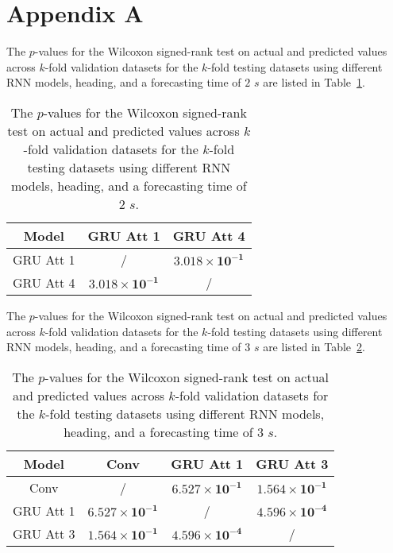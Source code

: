 \appendix
\section{Appendix A}
\label{appA}

The $p$-values for the Wilcoxon signed-rank test on actual and predicted values across $k$-fold validation datasets for the $k$-fold testing datasets using different RNN models, heading, and a forecasting time of $2$ $s$ are listed in Table~\ref{tab:direction:p:2}.

\begin{table}[!ht]
	\centering
	\begin{tabular}{|c|c|c|}
		\hline
		Model & GRU Att 1 & GRU Att 4 \\ \hline
		GRU Att 1 & / & $\mathbf{3.018 \times 10^{-1}}$ \\ \hline
		GRU Att 4 & $\mathbf{3.018 \times 10^{-1}}$ & / \\ \hline
	\end{tabular}
	\caption{The $p$-values for the Wilcoxon signed-rank test on actual and predicted values across $k$-fold validation datasets for the $k$-fold testing datasets using different RNN models, heading, and a forecasting time of $2$ $s$.}
	\label{tab:direction:p:2}
\end{table}

The $p$-values for the Wilcoxon signed-rank test on actual and predicted values across $k$-fold validation datasets for the $k$-fold testing datasets using different RNN models, heading, and a forecasting time of $3$ $s$ are listed in Table~\ref{tab:direction:p:3}.

\begin{table}[!ht]
	\centering
	\begin{tabular}{|c|c|c|c|}
		\hline
		Model & Conv & GRU Att 1 & GRU Att 3 \\ \hline
		Conv & / & $\mathbf{6.527 \times 10^{-1}}$ & $\mathbf{1.564 \times 10^{-1}}$ \\ \hline
		GRU Att 1 & $\mathbf{6.527 \times 10^{-1}}$ & / & $\mathbf{4.596 \times 10^{-4}}$ \\ \hline
		GRU Att 3 & $\mathbf{1.564 \times 10^{-1}}$ & $\mathbf{4.596 \times 10^{-4}}$ & / \\ \hline
	\end{tabular}
	\caption{The $p$-values for the Wilcoxon signed-rank test on actual and predicted values across $k$-fold validation datasets for the $k$-fold testing datasets using different RNN models, heading, and a forecasting time of $3$ $s$.}
	\label{tab:direction:p:3}
\end{table}

